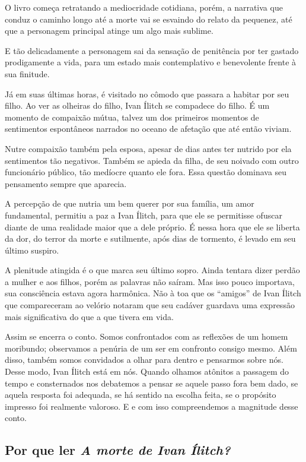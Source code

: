 \documentclass[12pt]{extarticle}
\begin{document}
O livro começa retratando a mediocridade cotidiana, porém, a narrativa
que conduz o caminho longo até a morte vai se esvaindo do relato da
pequenez, até que a personagem principal atinge um algo mais sublime.

E tão delicadamente a personagem sai da sensação de penitência por ter
gastado prodigamente a vida, para um estado mais contemplativo e
benevolente frente à sua finitude.

Já em suas últimas horas, é visitado no cômodo que passara a habitar por
seu filho. Ao ver as olheiras do filho, Ivan Ílitch se compadece do
filho. É um momento de compaixão mútua, talvez um dos primeiros momentos
de sentimentos espontâneos narrados no oceano de afetação que até então
viviam.

Nutre compaixão também pela esposa, apesar de dias antes ter nutrido por
ela sentimentos tão negativos. Também se apieda da filha, de seu noivado com outro funcionário público,
tão medíocre quanto ele fora. Essa questão dominava seu pensamento sempre que aparecia.

A percepção de que nutria um bem
querer por sua família, um amor fundamental, permitiu a
paz a Ivan Ílitch, para que ele se permitisse ofuscar diante de uma
realidade maior que a dele próprio. É nessa hora que ele se liberta da dor,
do terror da morte e sutilmente, após dias de tormento, é levado em
seu último suspiro.

A plenitude atingida é o que marca seu último sopro. Ainda tentara dizer
perdão a mulher e aos filhos, porém as palavras não saíram. Mas isso
pouco importava, sua consciência estava agora harmônica.
Não à toa que os ``amigos'' de Ivan Ílitch que compareceram ao velório
notaram que seu cadáver guardava uma expressão mais significativa do que
a que tivera em vida.

Assim se encerra o conto. Somos confrontados com as reflexões de
um homem moribundo; observamos a penúria de um ser em confronto consigo
mesmo. Além disso, também somos convidados a olhar para dentro e pensarmos
sobre nós. Desse modo, Ivan Ílitch está em nós. Quando olhamos atônitos
a passagem do tempo e consternados nos debatemos a pensar se aquele
passo fora bem dado, se aquela resposta foi adequada, se há sentido na
escolha feita, se o propósito impresso foi realmente valoroso. E e com isso compreendemos a magnitude desse conto.

\subsection{Por que ler \emph{A morte de Ivan Ílitch?}}
\end{document}
